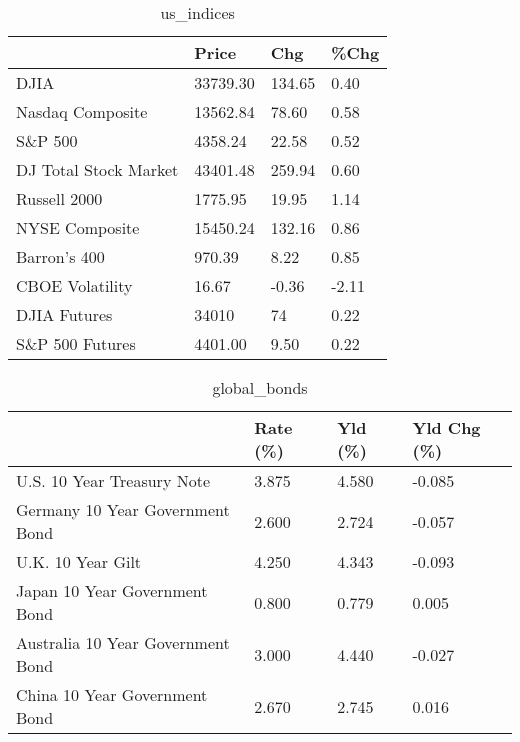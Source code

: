 \documentclass{article}%
\begin{document}
%


\begin{table}[htbp]%
\caption{us\_indices}%
\centering%
\begin{adjustbox}{width=1\textwidth}%
\begin{tabular}{llll}
\toprule
                      &    Price &    Chg &  \%Chg \\
\midrule
                 DJIA & 33739.30 & 134.65 &  0.40 \\
     Nasdaq Composite & 13562.84 &  78.60 &  0.58 \\
              S\&P 500 &  4358.24 &  22.58 &  0.52 \\
DJ Total Stock Market & 43401.48 & 259.94 &  0.60 \\
         Russell 2000 &  1775.95 &  19.95 &  1.14 \\
       NYSE Composite & 15450.24 & 132.16 &  0.86 \\
         Barron's 400 &   970.39 &   8.22 &  0.85 \\
      CBOE Volatility &    16.67 &  -0.36 & -2.11 \\
         DJIA Futures &    34010 &     74 &  0.22 \\
      S\&P 500 Futures &  4401.00 &   9.50 &  0.22 \\
\bottomrule
\end{tabular}
%
\end{adjustbox}%
\end{table}

%


\begin{table}[htbp]%
\caption{global\_bonds}%
\centering%
\begin{adjustbox}{width=1\textwidth}%
\begin{tabular}{llll}
\toprule
                                  & Rate (\%) & Yld (\%) & Yld Chg (\%) \\
\midrule
       U.S. 10 Year Treasury Note &    3.875 &   4.580 &      -0.085 \\
  Germany 10 Year Government Bond &    2.600 &   2.724 &      -0.057 \\
                U.K. 10 Year Gilt &    4.250 &   4.343 &      -0.093 \\
    Japan 10 Year Government Bond &    0.800 &   0.779 &       0.005 \\
Australia 10 Year Government Bond &    3.000 &   4.440 &      -0.027 \\
    China 10 Year Government Bond &    2.670 &   2.745 &       0.016 \\
\bottomrule
\end{tabular}
%
\end{adjustbox}%
\end{table}
\end{document}
